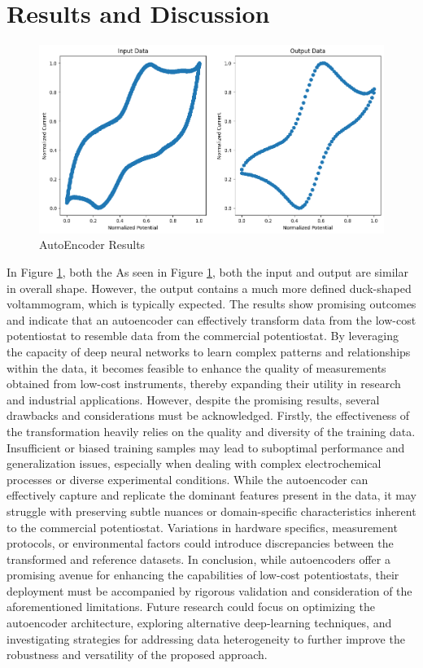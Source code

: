 \section{Results and Discussion}

\begin{figure}[h!]
  \centering
    \includegraphics[width=1\textwidth]{figures/autoencoder.png}
    \caption{AutoEncoder Results}
    \label{autoncoder_results}
\end{figure}
In Figure \ref{autoncoder_results}, both the
As seen in Figure \ref{autoncoder_results}, both the input and output are similar in overall shape. However, the output contains a much more defined duck-shaped voltammogram, which is typically expected. The results show promising outcomes and indicate that an autoencoder can effectively transform data from the low-cost potentiostat to resemble data from the commercial potentiostat. By leveraging the capacity of deep neural networks to learn complex patterns and relationships within the data, it becomes feasible to enhance the quality of measurements obtained from low-cost instruments, thereby expanding their utility in research and industrial applications.
However, despite the promising results, several drawbacks and considerations must be acknowledged. Firstly, the effectiveness of the transformation heavily relies on the quality and diversity of the training data. Insufficient or biased training samples may lead to suboptimal performance and generalization issues, especially when dealing with complex electrochemical processes or diverse experimental conditions. While the autoencoder can effectively capture and replicate the dominant features present in the data, it may struggle with preserving subtle nuances or domain-specific characteristics inherent to the commercial potentiostat. Variations in hardware specifics, measurement protocols, or environmental factors could introduce discrepancies between the transformed and reference datasets. 
In conclusion, while autoencoders offer a promising avenue for enhancing the capabilities of low-cost potentiostats, their deployment must be accompanied by rigorous validation and consideration of the aforementioned limitations. Future research could focus on optimizing the autoencoder architecture, exploring alternative deep-learning techniques, and investigating strategies for addressing data heterogeneity to further improve the robustness and versatility of the proposed approach.

